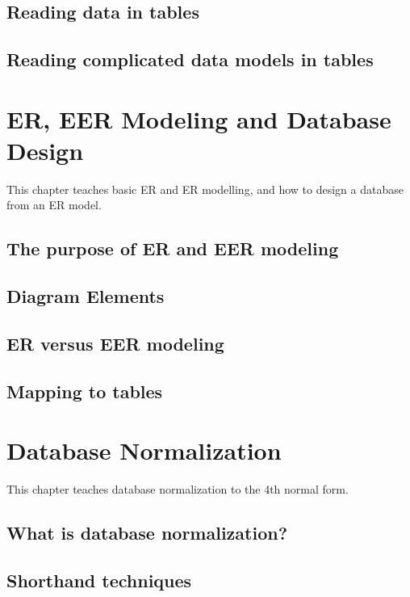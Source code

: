 \section{Reading data in tables}
\section{Reading complicated data models in tables}

\chapter{ER, EER Modeling and Database Design}
\label{chap:relational:eer-modeling-and-database-design}
This chapter teaches basic ER and ER modelling, and how to design a database from an ER model.

\section{The purpose of ER and EER modeling}
\section{Diagram Elements}
\section{ER versus EER modeling}
\section{Mapping to tables}

\chapter{Database Normalization}
\label{chap:relational:database-normalization}
This chapter teaches database normalization to the 4th normal form.

\section{What is database normalization?}
\section{Shorthand techniques}
